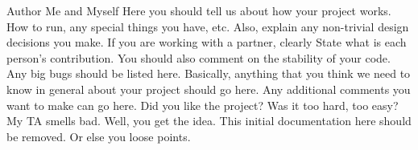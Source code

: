 \begin{DoxyAuthor}{Author}
Me and Myself Here you should tell us about how your project works. How to run, any special things you have, etc. Also, explain any non-\/trivial design decisions you make. If you are working with a partner, clearly State what is each person’s contribution. You should also comment on the stability of your code. Any big bugs should be listed here. Basically, anything that you think we need to know in general about your project should go here. Any additional comments you want to make can go here. Did you like the project? Was it too hard, too easy? My T\-A smells bad. Well, you get the idea. This initial documentation here should be removed. Or else you loose points. 
\end{DoxyAuthor}
